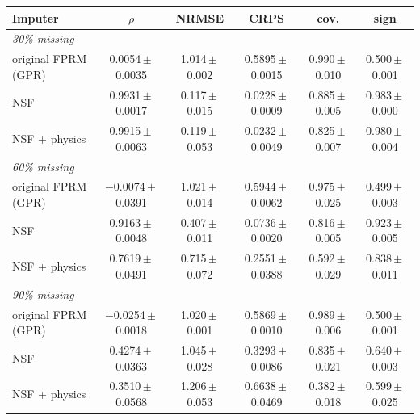 \begin{tabular}{lccccc}
\toprule
Imputer & $\rho$ & NRMSE & CRPS & cov. & sign\\
\midrule
\multicolumn{6}{l}{\textit{30\% missing}}\\
original FPRM (GPR) & 0.0054\,$\pm$\,0.0035 & 1.014\,$\pm$\,0.002 & 0.5895\,$\pm$\,0.0015 & 0.990\,$\pm$\,0.010 & 0.500\,$\pm$\,0.001\\
NSF & 0.9931\,$\pm$\,0.0017 & 0.117\,$\pm$\,0.015 & 0.0228\,$\pm$\,0.0009 & 0.885\,$\pm$\,0.005 & 0.983\,$\pm$\,0.000\\
NSF + physics & 0.9915\,$\pm$\,0.0063 & 0.119\,$\pm$\,0.053 & 0.0232\,$\pm$\,0.0049 & 0.825\,$\pm$\,0.007 & 0.980\,$\pm$\,0.004\\
\midrule
\multicolumn{6}{l}{\textit{60\% missing}}\\
original FPRM (GPR) & $-$0.0074\,$\pm$\,0.0391 & 1.021\,$\pm$\,0.014 & 0.5944\,$\pm$\,0.0062 & 0.975\,$\pm$\,0.025 & 0.499\,$\pm$\,0.003\\
NSF & 0.9163\,$\pm$\,0.0048 & 0.407\,$\pm$\,0.011 & 0.0736\,$\pm$\,0.0020 & 0.816\,$\pm$\,0.005 & 0.923\,$\pm$\,0.005\\
NSF + physics & 0.7619\,$\pm$\,0.0491 & 0.715\,$\pm$\,0.072 & 0.2551\,$\pm$\,0.0388 & 0.592\,$\pm$\,0.029 & 0.838\,$\pm$\,0.011\\
\midrule
\multicolumn{6}{l}{\textit{90\% missing}}\\
original FPRM (GPR) & $-$0.0254\,$\pm$\,0.0018 & 1.020\,$\pm$\,0.001 & 0.5869\,$\pm$\,0.0010 & 0.989\,$\pm$\,0.006 & 0.500\,$\pm$\,0.001\\
NSF & 0.4274\,$\pm$\,0.0363 & 1.045\,$\pm$\,0.028 & 0.3293\,$\pm$\,0.0086 & 0.835\,$\pm$\,0.021 & 0.640\,$\pm$\,0.003\\
NSF + physics & 0.3510\,$\pm$\,0.0568 & 1.206\,$\pm$\,0.053 & 0.6638\,$\pm$\,0.0469 & 0.382\,$\pm$\,0.018 & 0.599\,$\pm$\,0.025\\
\bottomrule
\end{tabular}
